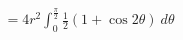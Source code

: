 \documentclass[preview]{standalone}
\begin{document}
\begin{align*}
=4r^{2}\int_{0}^{\frac{\pi}{2}}\frac{1}{2}\left(1+\cos2\theta\right)\ d\theta
\end{align*}
\end{document}

